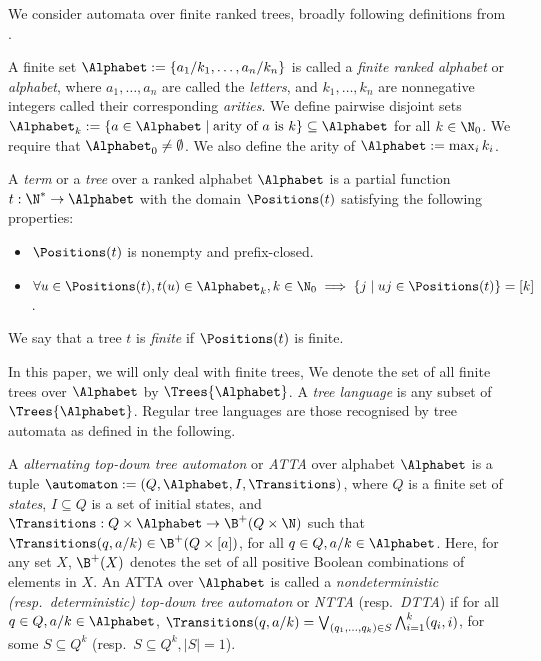 We consider automata over finite ranked trees, broadly following definitions from \cite{tata}.

\begin{definition}[Alphabet]\label{def:alphabet}
  A finite set $\Alphabet := \{a_1/k_1, \dots, a_n/k_n\}$ is called a \emph{finite ranked alphabet} or \emph{alphabet}, where $a_1, \dots, a_n$ are called the \emph{letters}, and $k_1, \dots, k_n$ are nonnegative integers called their corresponding \emph{arities}. We define pairwise disjoint sets $\Alphabet_k := \{a \in \Alphabet \mid \mbox{arity of $a$ is $k$}\} \subseteq \Alphabet$ for all $k \in \N_0$. We require that $\Alphabet_0 \neq \emptyset$. We also define the arity of $\Alphabet := \max_{i} k_i$.
\end{definition}

\begin{definition}\label{def:tree}
	A \emph{term} or a \emph{tree} over a ranked alphabet $\Alphabet$ is a partial function $t : \N^* \to \Alphabet$ with the domain $\Positions(t)$ satisfying the following properties:
	\begin{itemize}
		\item $\Positions(t)$ is nonempty and prefix-closed.
		\item $\forall u \in \Positions(t), t(u) \in \Alphabet_k, k \in \N_0 \implies \{j \mid uj \in \Positions(t)\} = [k]$.
	\end{itemize}
	We say that a tree $t$ is \emph{finite} if $\Positions(t)$ is finite.
\end{definition}
In this paper, we will only deal with finite trees, We denote the set of all finite trees over $\Alphabet$ by $\Trees{\Alphabet}$. A \emph{tree language} is any subset of $\Trees{\Alphabet}$. Regular tree languages are those recognised by tree automata as defined in the following.

\begin{definition}\label{def:alternatingTreeAutomaton}
  A \emph{alternating top-down tree automaton} or \emph{ATTA} over
  alphabet $\Alphabet$ is a tuple $\automaton := (Q, \Alphabet, I,
  \Transitions)$, where $Q$ is a finite set of \emph{states}, $I
  \subseteq Q$ is a set of initial states, and $\Transitions : Q
  \times \Alphabet \to \B^+(Q \times \N)$ such that $\Transitions(q,
  a/k) \in \B^+(Q \times [a])$, for all $q \in Q, a/k \in \Alphabet$.
  Here, for any set $X$, $\B^+(X)$ denotes the set of all positive Boolean
  combinations of elements in $X$. An ATTA over $\Alphabet$ is called
  a \emph{nondeterministic (resp.~deterministic) top-down tree
  automaton} or \emph{NTTA} (resp.~\emph{DTTA}) if for all $q \in Q,
  a/k \in \Alphabet$, $\Transitions(q, a/k) = \bigvee_{(q_1, \dots,
  q_k) \in S} \bigwedge_{i=1}^{k} (q_i, i)$, for some $S \subseteq
  Q^k$ (resp.~$S \subseteq Q^k, |S| = 1$).
\end{definition}

